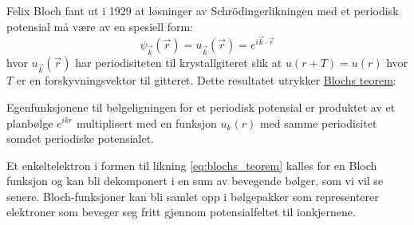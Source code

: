\documentclass{article}
\begin{document}
Felix Bloch fant ut i 1929 at løsninger av Schrödingerlikningen med et periodisk potensial må være av en spesiell form:
\begin{equation}
    \label{eq:blochs_teorem}
    \boxed{\psi_{\vec{k}}(\vec{r}) = u_{\vec{k}}(\vec{r}) = e^{i \vec{k} \cdot \vec{r}}}
\end{equation}
hvor $u_{\vec{k}}(\vec{r})$ har periodisiteten til krystallgiteret slik at $u(r + T) = u(r)$ hvor $T$ er en forskyvningsvektor til gitteret. Dette resultatet utrykker \underline{Blochs teorem}:
\begin{center}
\begin{adjustbox}{width=0.85\textwidth}
\parbox{\linewidth}{
Egenfunksjonene til bølgeligningen for et periodisk potensial er produktet av et planbølge $e^{i k r}$ multiplisert med en funksjon $u_k(r)$ med samme periodisitet somdet periodiske potensialet.
}
\end{adjustbox}
\end{center}
Et enkeltelektron i formen til likning \ref{eq:blochs_teorem} kalles for en Bloch funksjon og kan bli dekomponert i en sum av bevegende bølger, som vi vil se senere. Bloch-funksjoner kan bli samlet opp i bølgepakker som representerer elektroner som beveger seg fritt gjennom potensialfeltet til ionkjernene.
\end{document}

